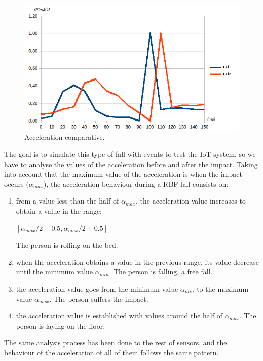 \documentclass[conference]{IEEEtran}
\theoremstyle{definition}
\begin{document}
\begin{figure}[!h]
  \centering
  \includegraphics[scale=0.4]{img/Comparativa}
  \caption[Acceleration comparative]{Acceleration comparative.}
  \label{fig:Sensor1}
\end{figure}

The goal is to simulate this type of fall with events to test the IoT system, so we have to analyse the values of 
the acceleration before and after the impact. Taking into account that the maximum value of the acceleration is 
when the impact occurs ($\alpha_{max}$), the acceleration behaviour during a RBF fall consists on:
\begin{enumerate}
 \item from a value less than the half of $\alpha_{max}$, the acceleration value increases to obtain a value in the range:
  \begin{center}
  $[\alpha_{max}/2 - 0.5, \alpha_{max}/2 + 0.5]$
  \end{center}
 The person is rolling on the bed.
 \item when the acceleration obtains a value in the previous range, its value decrease until the minimum value $\alpha_{min}$.
 The person is falling, a free fall.
 \item the acceleration value goes from the minimum value $\alpha_{min}$ to the maximum value $\alpha_{max}$. The person
 suffers the impact.
 \item the acceleration value is established with values around the half of $\alpha_{max}$. The person is laying on the floor. 
\end{enumerate}

The same analysis process has been done to the rest of sensors, and the behaviour of the acceleration of all of them 
follows the same pattern.
\end{document}
